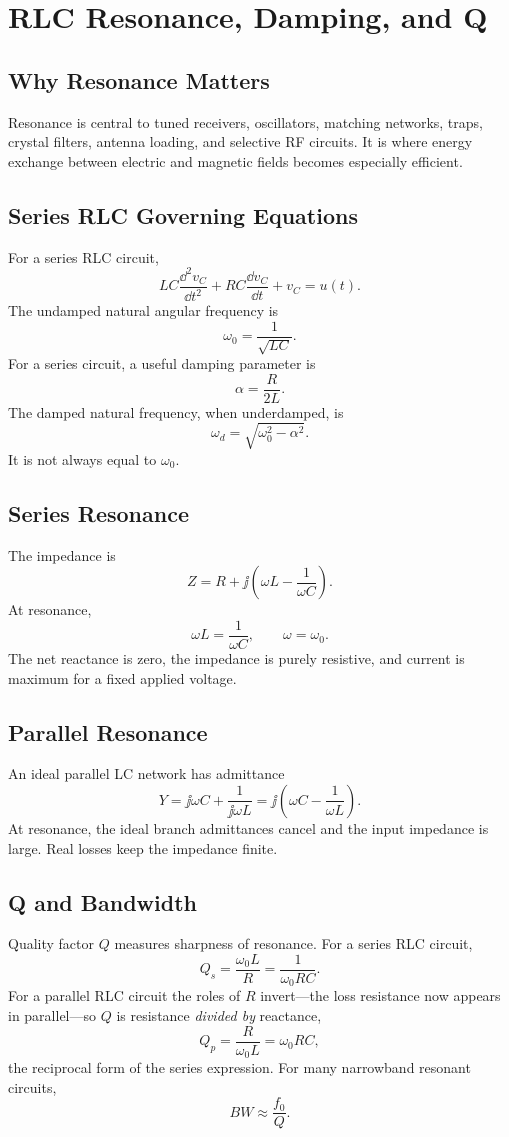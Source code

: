 \chapter{RLC Resonance, Damping, and Q}
\section{Why Resonance Matters}
Resonance is central to tuned receivers, oscillators, matching networks, traps,
crystal filters, antenna loading, and selective RF circuits. It is where energy
exchange between electric and magnetic fields becomes especially efficient.

\section{Series RLC Governing Equations}
For a series RLC circuit,
\[
LC\frac{\dd^2 v_C}{\dd t^2}
+RC\frac{\dd v_C}{\dd t}
+v_C=u(t).
\]
The undamped natural angular frequency is
\[
\omega_0=\frac{1}{\sqrt{LC}}.
\]
For a series circuit, a useful damping parameter is
\[
\alpha=\frac{R}{2L}.
\]
The damped natural frequency, when underdamped, is
\[
\omega_d=\sqrt{\omega_0^2-\alpha^2}.
\]
It is not always equal to \(\omega_0\).

\section{Series Resonance}
The impedance is
\[
Z=R+\jj\left(\omega L-\frac{1}{\omega C}\right).
\]
At resonance,
\[
\omega L=\frac{1}{\omega C},
\qquad
\omega=\omega_0.
\]
The net reactance is zero, the impedance is purely resistive, and current is
maximum for a fixed applied voltage.

\section{Parallel Resonance}
An ideal parallel LC network has admittance
\[
Y=\jj\omega C+\frac{1}{\jj\omega L}
=\jj\left(\omega C-\frac{1}{\omega L}\right).
\]
At resonance, the ideal branch admittances cancel and the input impedance is
large. Real losses keep the impedance finite.

\section{Q and Bandwidth}
Quality factor \(Q\) measures sharpness of resonance. For a series RLC circuit,
\[
Q_s=\frac{\omega_0 L}{R}=\frac{1}{\omega_0RC}.
\]
For a parallel RLC circuit the roles of \(R\) invert---the loss resistance now
appears in parallel---so \(Q\) is resistance \emph{divided by} reactance,
\[
Q_p=\frac{R}{\omega_0 L}=\omega_0 RC,
\]
the reciprocal form of the series expression. For many narrowband resonant
circuits,
\[
BW\approx \frac{f_0}{Q}.
\]

